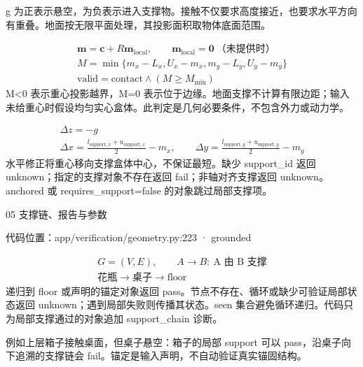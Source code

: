 \documentclass[10pt,a4paper]{article}
\begin{document}
g 为正表示悬空，为负表示进入支撑物。接触不仅要求高度接近，也要求水平方向有重叠。地面按无限平面处理，其投影面积取物体底面范围。\par
\par{}
\[\begin{gathered}\mathbf m=\mathbf c+R\mathbf m_{\mathrm{local}},\qquad\mathbf m_{\mathrm{local}}=\mathbf0\ \text{（未提供时）}\\ M=\min\{m_x-L_x,U_x-m_x,m_y-L_y,U_y-m_y\}\\ \mathrm{valid}=\mathrm{contact}\land(M\ge M_{\min})\end{gathered}\]
M<0 表示重心投影越界，M=0 表示位于边缘。地面支撑不计算有限边距；输入未给重心时假设均匀实心盒体。此判定是几何必要条件，不包含外力或动力学。\par
\par{}
\[\begin{gathered}\Delta z=-g\\ \Delta x=\frac{l_{\mathrm{support},x}+u_{\mathrm{support},x}}{2}-m_x,\qquad \Delta y=\frac{l_{\mathrm{support},y}+u_{\mathrm{support},y}}{2}-m_y\end{gathered}\]
水平修正将重心移向支撑盒体中心，不保证最短。缺少 support\_id 返回 unknown；指定的支撑对象不存在返回 fail；非轴对齐支撑返回 unknown。anchored 或 requires\_support=false 的对象跳过局部支撑项。\par
\clearpage
{\color{ink}\LARGE 05 支撑链、报告与参数\par}\vspace{5pt}
{\footnotesize\color{ink} 代码位置：app/verification/geometry.py:223 · grounded\par}
\par{}
\[\begin{gathered}G=(V,E),\qquad A\to B:\ \text{A 由 B 支撑}\\ \text{花瓶}\to\text{桌子}\to\mathrm{floor}\end{gathered}\]
递归到 floor 或声明的锚定对象返回 pass。节点不存在、循环或缺少可验证局部状态返回 unknown；遇到局部失败则传播其状态。seen 集合避免循环递归。代码只为局部支撑通过的对象追加 support\_chain 诊断。\par
例如上层箱子接触桌面，但桌子悬空：箱子的局部 support 可以 pass，沿桌子向下追溯的支撑链会 fail。锚定是输入声明，不自动验证真实锚固结构。\par
\end{document}
